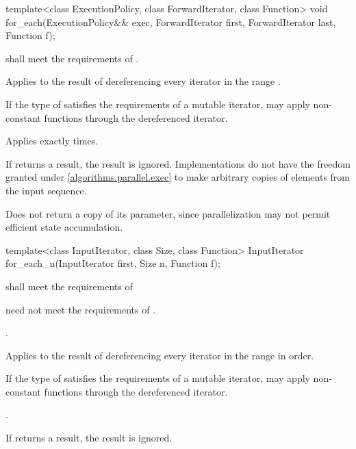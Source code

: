 %
\begin{itemdecl}
template<class ExecutionPolicy, class ForwardIterator, class Function>
  void for_each(ExecutionPolicy&& exec,
                ForwardIterator first, ForwardIterator last,
                Function f);
\end{itemdecl}

\begin{itemdescr}
\pnum
\requires
{} shall meet the requirements of .

\pnum
\effects
Applies  to the result of dereferencing every iterator in the range
.
\begin{note}
If the type of  satisfies the requirements of a mutable iterator,
 may apply non-constant functions through the dereferenced iterator.
\end{note}

\pnum
\complexity
Applies  exactly  times.

\pnum
\remarks
If  returns a result, the result is ignored.
Implementations do not
have the freedom granted under \ref{algorithms.parallel.exec} to make arbitrary
copies of elements from the input sequence.

\pnum
\begin{note}
Does not return a copy of its  parameter, since
parallelization may not permit efficient state accumulation.
\end{note}
\end{itemdescr}

%
\begin{itemdecl}
template<class InputIterator, class Size, class Function>
  InputIterator for_each_n(InputIterator first, Size n, Function f);
\end{itemdecl}

\begin{itemdescr}
\pnum
\requires
{} shall meet the requirements of 
\begin{note}  need not meet the requirements of
. \end{note}

\pnum
\requires
{}.

\pnum
\effects
Applies  to the result of dereferencing every iterator in the range
 in order.
\begin{note}
If the type of  satisfies the requirements of a mutable iterator,
 may apply non-constant functions through the dereferenced iterator.
\end{note}

\pnum
\returns
{}.

\pnum
\remarks
If  returns a result, the result is ignored.
\end{itemdescr}

